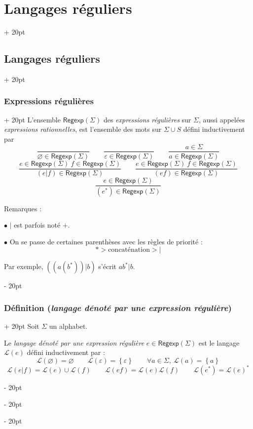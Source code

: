 \documentclass[a4paper, 12pt, twoside]{article}
\newcommand{\lr}[1]{\left( #1 \right)}
\newcommand{\set}[1]{\left\{ #1 \right\}}
\newcommand{\ind}[1][20pt]{\advance\leftskip + #1}
\newcommand{\deind}[1][20pt]{\advance\leftskip - #1}
\newenvironment{indt}[2][20pt]{#2 \par \ind[#1]}{\par \deind} %
\newcommand{\Regexp}{\mathsf{Regexp}}
\begin{document}
\begin{indt}{\section{Langages réguliers}}
\begin{indt}{\subsection{Langages réguliers}}
\begin{indt}{\subsubsection{Expressions régulières}}
                L'ensemble $\Regexp(\Sigma)$ des \emph{expressions régulières} sur $\Sigma$, aussi appelées \emph{expressions rationnelles}, est l'ensemble des mots sur $\Sigma \cup S$ défini inductivement par
                \[
                    \dfrac{}{\varnothing \in \Regexp(\Sigma)}
                    \qquad
                    \dfrac{}{\varepsilon \in \Regexp(\Sigma)}
                    \qquad
                    \dfrac{a \in \Sigma}{a \in \Regexp(\Sigma)}
                \]
                \[
                    \dfrac{e \in \Regexp(\Sigma)\ f \in \Regexp(\Sigma)}{(e | f) \in \Regexp(\Sigma)}
                    \qquad
                    \dfrac{e \in \Regexp(\Sigma)\ f \in \Regexp(\Sigma)}{(ef) \in \Regexp(\Sigma)}
                \]
                \[
                    \dfrac{e \in \Regexp(\Sigma)}{(e^*) \in \Regexp(\Sigma)}
                \]

                Remarques :

                $\bullet$ $|$ est parfois noté $+$.

                $\bullet$ On se passe de certaines parenthèses avec les règles de priorité :
                \[
                    * > \text{concaténation} > |
                \]

                Par exemple, $\lr{\lr{a\lr{b^*}} | b}$ s'écrit $a b^* | b$.
            \end{indt}

            \vspace{12pt}
            
            \begin{indt}{\subsubsection{Définition (\textit{langage dénoté par une expression régulière})}}
                Soit $\Sigma$ un alphabet.

                Le \emph{langage dénoté par une expression régulière} $e \in \Regexp(\Sigma)$ est le langage $\mathcal L(e)$ défini inductivement par :
                \[
                    \mathcal L(\varnothing) = \varnothing
                    \qquad
                    \mathcal L(\varepsilon) = \set \varepsilon
                    \qquad
                    \forall a \in \Sigma,\ \mathcal L(a) = \set a
                \]
                \[
                    \mathcal L(e | f) = \mathcal L(e) \cup \mathcal L(f)
                    \qquad
                    \mathcal L(ef) = \mathcal L(e) \mathcal L(f)
                    \qquad
                    \mathcal L(e^*) = \mathcal L(e)^*
                \]


\end{indt}
\end{indt}
\end{indt}
\end{document}

